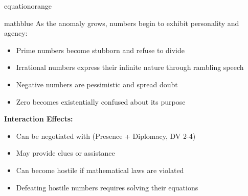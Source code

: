 \documentclass[11pt]{article}
\begin{document}
\begin{campaignsection}{equationorange}
\begin{mechanicbox}{mathblue}
As the anomaly grows, numbers begin to exhibit personality and agency:
\begin{itemize}
    \item Prime numbers become stubborn and refuse to divide
    \item Irrational numbers express their infinite nature through rambling speech
    \item Negative numbers are pessimistic and spread doubt
    \item Zero becomes existentially confused about its purpose
\end{itemize}
\textbf{Interaction Effects:}
\begin{itemize}
    \item Can be negotiated with (Presence + Diplomacy, DV 2-4)
    \item May provide clues or assistance
    \item Can become hostile if mathematical laws are violated
    \item Defeating hostile numbers requires solving their equations
\end{itemize}
\end{mechanicbox}
\end{campaignsection}

\newpage
\end{document}
